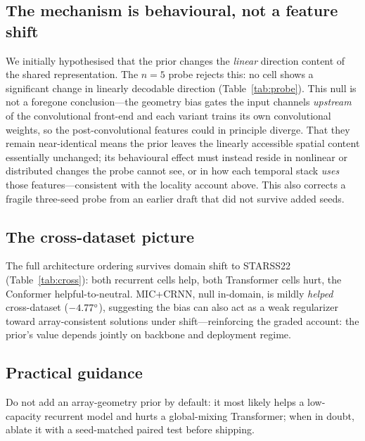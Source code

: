 \subsection{The mechanism is behavioural, not a feature shift}
We initially hypothesised that the prior changes the \emph{linear} direction
content of the shared representation. The $n=5$ probe rejects this: no cell shows
a significant change in linearly decodable direction (Table~\ref{tab:probe}). This
null is not a foregone conclusion---the geometry bias gates the input channels
\emph{upstream} of the convolutional front-end and each variant trains its own
convolutional weights, so the post-convolutional features could in principle
diverge. That they remain near-identical means the
prior leaves the linearly accessible spatial content essentially unchanged; its
behavioural effect must instead reside in nonlinear or distributed changes the
probe cannot see, or in how each temporal stack \emph{uses} those
features---consistent with the locality account above. This also corrects a
fragile three-seed probe from an earlier draft that did not survive added seeds.

\subsection{The cross-dataset picture}
The full architecture ordering survives domain shift to STARSS22
(Table~\ref{tab:cross}): both recurrent cells help, both Transformer cells hurt,
the Conformer helpful-to-neutral. MIC+CRNN, null in-domain, is mildly
\emph{helped} cross-dataset ($-4.77^\circ$), suggesting the bias can
also act as a weak regularizer toward array-consistent solutions under
shift---reinforcing the graded account: the prior's value
depends jointly on backbone and deployment regime.

\subsection{Practical guidance}
Do not add an array-geometry prior by default: it most likely helps a
low-capacity recurrent model and hurts a global-mixing Transformer; when in
doubt, ablate it with a seed-matched paired test before shipping.

